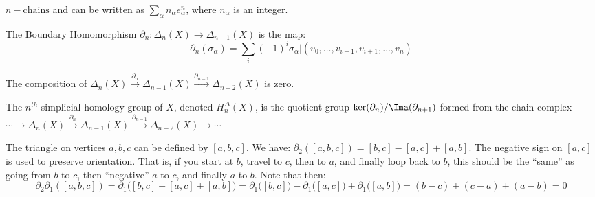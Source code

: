 \documentclass[crop=false,class=article,oneside]{standalone}
\begin{document}
            $n-\textrm{chains}$ and can be written as
            $\sum_{\alpha}n_{\alpha}e_{\alpha}^{n}$, where
            $n_{\alpha}$ is an integer.
            \begin{definition}
                The Boundary Homomorphism
                $\partial_{n}:%
                 \Delta_{n}(X)\rightarrow\Delta_{n-1}(X)$
                is the map:
                \begin{equation*}
                    \partial_{n}(\sigma_{\alpha})=
                    \sum_{i}(-1)^{i}\sigma_{\alpha}|
                    (v_{0},\hdots,v_{i-1},v_{i+1},\hdots,v_{n})
                \end{equation*}
            \end{definition}
            \begin{theorem}
                The composition of
                $\Delta_{n}(X)%
                 \overset{\partial_{n}}{\longrightarrow}%
                 \Delta_{n-1}(X)%
                 \overset{\partial_{n-1}}{\longrightarrow}%
                 \Delta_{n-2}(X)$
                is zero.
            \end{theorem}
            \begin{definition}
                The $n^{th}$ simplicial homology group of
                $X$, denoted $H_{n}^{\Delta}(X)$,
                is the quotient group
                $\ker(\partial_{n})/\Ima(\partial_{n+1})$
                formed from the chain complex
                $\cdots\longrightarrow\Delta_{n}(X)%
                 \overset{\partial_{n}}{\longrightarrow}%
                 \Delta_{n-1}(X)%
                 \overset{\partial_{n-1}}{\longrightarrow}%
                 \Delta_{n-2}(X)\longrightarrow\cdots$
            \end{definition}
            The triangle on vertices $a,b,c$ can be defined
            by $[a,b,c]$. We have:
            $\partial_{2}([a,b,c])=[b,c]-[a,c]+[a,b]$.
            The negative sign on $[a,c]$ is used to preserve
            orientation. That is, if you start at $b$,
            travel to $c$, then to $a$, and finally loop
            back to $b$, this should be the ``same'' as going
            from $b$ to $c$, then ``negative'' $a$ to $c$, and
            finally $a$ to $b$. Note that then:
            \begin{equation*}
                \partial_{2}\partial_{1}([a,b,c])
                =\partial_{1}\big([b,c]-[a,c]+[a,b]\big)
                =\partial_{1}\big([b,c]\big)
                -\partial_{1}\big([a,c]\big)
                +\partial_{1}\big([a,b]\big)
                =(b-c)+(c-a)+(a-b)=0
            \end{equation*}
\end{document}
